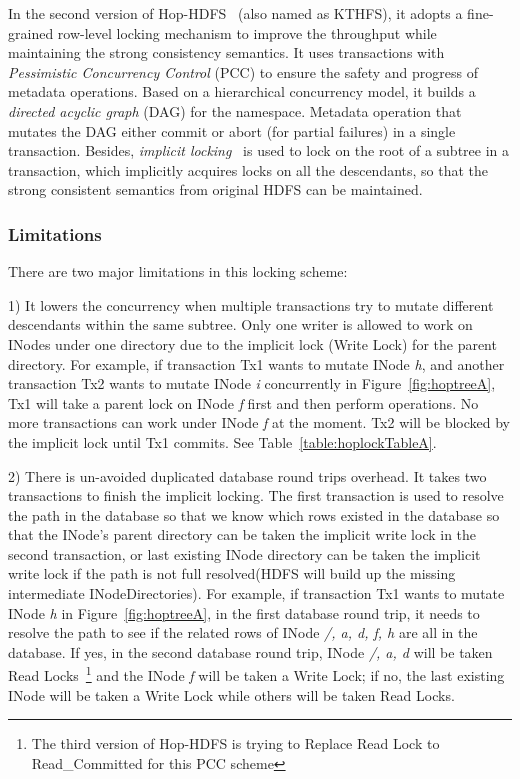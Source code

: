 \documentclass[runningheads,a4paper]{llncs}
\begin{document}
In the second version of Hop-HDFS~\cite{peiro2013maintaining} (also named as KTHFS), it adopts a fine-grained row-level locking mechanism to improve the throughput while maintaining the strong consistency semantics. It uses transactions with \textit{Pessimistic Concurrency Control} (PCC) to ensure the safety and progress of metadata operations. Based on a hierarchical concurrency model, it builds a \textit{directed acyclic graph} (DAG) for the namespace. Metadata operation that mutates the DAG either commit or abort (for partial failures) in a single transaction. Besides, \textit{implicit locking}~\cite{gray1976granularity} is used to lock on the root of a subtree in a transaction, which implicitly acquires locks on all the descendants, so that the strong consistent semantics from original HDFS can be maintained.

\subsubsection{Limitations}

There are two major limitations in this locking scheme: 

1) It lowers the concurrency when multiple transactions try to mutate different descendants within the same subtree. Only one writer is allowed to work on INodes under one directory due to the implicit lock (Write Lock) for the parent directory. For example, if transaction Tx1 wants to mutate INode \textit{h}, and another transaction Tx2 wants to mutate INode \textit{i} concurrently in Figure~\ref{fig:hoptreeA}, Tx1 will take a parent lock on INode \textit{f} first and then perform operations. No more transactions can work under INode \textit{f} at the moment. Tx2 will be blocked by the implicit lock until Tx1 commits. See Table~\ref{table:hoplockTableA}.

2) There is un-avoided duplicated database round trips overhead. It takes two transactions to finish the implicit locking. The first transaction is used to resolve the path in the database so that we know which rows existed in the database so that the INode's parent directory can be taken the implicit write lock in the second transaction, or last existing INode directory can be taken the implicit write lock if the path is not full resolved(HDFS will build up the missing intermediate INodeDirectories). For example, if transaction Tx1 wants to mutate INode \textit{h} in Figure~\ref{fig:hoptreeA}, in the first database round trip, it needs to resolve the path to see if the related rows of INode\textit{ /, a, d, f, h} are all in the database. If yes, in the second database round trip, INode\textit{ /, a, d} will be taken Read Locks~\footnote{The third version of Hop-HDFS is trying to Replace Read Lock to Read\_Committed for this PCC scheme} and the INode \textit{f} will be taken a Write Lock; if no, the last existing INode will be taken a Write Lock while others will be taken Read Locks.
\end{document}
